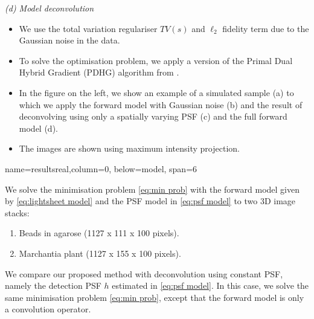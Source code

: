 \documentclass[a0paper,portrait,fontscale=0.35]{baposter}
\newcommand{\mycaption}[1]{
  {
    \smaller
    \emph{#1}
  }
}
\theoremstyle{plain}
\theoremstyle{plain}
\theoremstyle{definition}
\theoremstyle{plain}
\theoremstyle{definition}
\begin{document}
\begin{poster}
{\begin{minipage}[t]{0.55\textwidth}
\begin{minipage}[t]{0.49\textwidth}
        \vspace{0.3em}
        \mycaption{
          (d) Model deconvolution
        }
      \end{minipage}
    \end{minipage}
    \hspace{-0.5em}
    \begin{minipage}[t]{0.45\textwidth}
      \begin{itemize}
        \item We use the total variation regulariser $TV(s)$
          and $\ell_2$ fidelity term due to the Gaussian
          noise in the data. 

        \item To solve the optimisation problem, we apply a version
          of the Primal Dual Hybrid Gradient (PDHG) 
          algorithm from \cite{Boulanger2018,Condat2013}.

        \item In the figure on the left, we show an example of a simulated sample (a) 
          to which we apply the forward model with Gaussian noise (b)
          and the result of deconvolving using only a spatially varying
          PSF (c) and the full forward model (d). 

        \item The images are shown 
          using maximum intensity projection.
      \end{itemize}
    \end{minipage}
}

{name=resultsreal,column=0, below=model, span=6}{
  \begin{minipage}[t]{0.33\textwidth} 
 
    \vspace{1em}
    We solve the minimisation problem \eqref{eq:min prob}
    with the forward model given by \eqref{eq:lightsheet model}
    and the PSF model in \eqref{eq:psf model}
    to two 3D image stacks: 
    \begin{enumerate} 
      \item Beads in agarose (1127 x 111 x 100 pixels).

      \item Marchantia plant (1127 x 155 x 100 pixels).
    \end{enumerate}

    We compare our proposed method with deconvolution using
    constant PSF, namely the detection PSF $h$
    estimated in \eqref{eq:psf model}. In this case,
    we solve the same minimisation problem \eqref{eq:min prob}, 
    except that the forward model is only a convolution
    operator.


\end{minipage}}
\end{poster}
\end{document}
